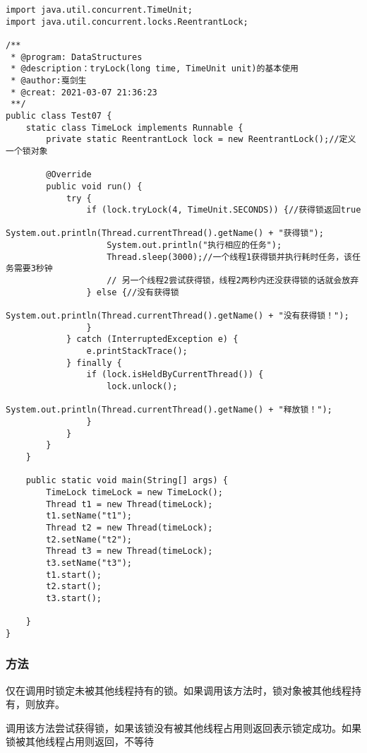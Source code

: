 \documentclass[a4paper]{report}
\begin{document}
\begin{Verbatim}[frame=single,numbersep=5pt,xleftmargin=1.5em,xrightmargin=1.5em]
import java.util.concurrent.TimeUnit;
import java.util.concurrent.locks.ReentrantLock;

/**
 * @program: DataStructures
 * @description：tryLock(long time, TimeUnit unit)的基本使用
 * @author:戛剑生
 * @creat: 2021-03-07 21:36:23
 **/
public class Test07 {
    static class TimeLock implements Runnable {
        private static ReentrantLock lock = new ReentrantLock();//定义一个锁对象

        @Override
        public void run() {
            try {
                if (lock.tryLock(4, TimeUnit.SECONDS)) {//获得锁返回true
                    System.out.println(Thread.currentThread().getName() + "获得锁");
                    System.out.println("执行相应的任务");
                    Thread.sleep(3000);//一个线程1获得锁并执行耗时任务，该任务需要3秒钟
                    // 另一个线程2尝试获得锁，线程2两秒内还没获得锁的话就会放弃
                } else {//没有获得锁
                    System.out.println(Thread.currentThread().getName() + "没有获得锁！");
                }
            } catch (InterruptedException e) {
                e.printStackTrace();
            } finally {
                if (lock.isHeldByCurrentThread()) {
                    lock.unlock();
                    System.out.println(Thread.currentThread().getName() + "释放锁！");
                }
            }
        }
    }

    public static void main(String[] args) {
        TimeLock timeLock = new TimeLock();
        Thread t1 = new Thread(timeLock);
        t1.setName("t1");
        Thread t2 = new Thread(timeLock);
        t2.setName("t2");
        Thread t3 = new Thread(timeLock);
        t3.setName("t3");
        t1.start();
        t2.start();
        t3.start();

    }
}\end{Verbatim}
\subsubsection{方法}
仅在调用时锁定未被其他线程持有的锁。如果调用该方法时，锁对象被其他线程持有，则放弃。

调用该方法尝试获得锁，如果该锁没有被其他线程占用则返回表示锁定成功。如果锁被其他线程占用则返回，不等待
\section{}


\subsection{}


\subsection{}
\end{document}
